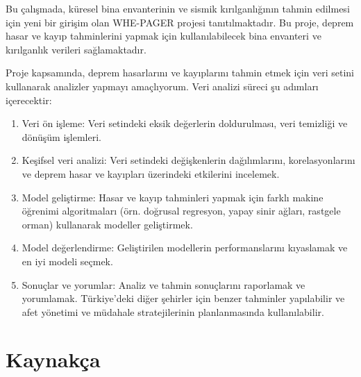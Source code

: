 \documentclass[
  12pt,
]{article}
\providecommand{\tightlist}{%
  \setlength{\itemsep}{0pt}\setlength{\parskip}{0pt}}
\newlength{\cslhangindent}
\newlength{\cslentryspacingunit} %
\newenvironment{CSLReferences}[2] %
 {%
  \setlength{\parindent}{0pt}
  \ifodd #1
  \let\oldpar\par
  \def\par{\hangindent=\cslhangindent\oldpar}
  \fi
  \setlength{\parskip}{#2\cslentryspacingunit}
 }%
 {}
\begin{document}
Bu çalışmada, küresel bina envanterinin ve sismik kırılganlığının tahmin edilmesi için yeni bir girişim olan WHE-PAGER projesi tanıtılmaktadır. Bu proje, deprem hasar ve kayıp tahminlerini yapmak için kullanılabilecek bina envanteri ve kırılganlık verileri sağlamaktadır.

Proje kapsamında, deprem hasarlarını ve kayıplarını tahmin etmek için veri setini kullanarak analizler yapmayı amaçlıyorum. Veri analizi süreci şu adımları içerecektir:

\begin{enumerate}
\def\labelenumi{\arabic{enumi}.}
\tightlist
\item
  Veri ön işleme: Veri setindeki eksik değerlerin doldurulması, veri temizliği ve dönüşüm işlemleri.
\item
  Keşifsel veri analizi: Veri setindeki değişkenlerin dağılımlarını, korelasyonlarını ve deprem hasar ve kayıpları üzerindeki etkilerini incelemek.
\item
  Model geliştirme: Hasar ve kayıp tahminleri yapmak için farklı makine öğrenimi algoritmaları (örn. doğrusal regresyon, yapay sinir ağları, rastgele orman) kullanarak modeller geliştirmek.
\item
  Model değerlendirme: Geliştirilen modellerin performanslarını kıyaslamak ve en iyi modeli seçmek.
\item
  Sonuçlar ve yorumlar: Analiz ve tahmin sonuçlarını raporlamak ve yorumlamak. Türkiye'deki diğer şehirler için benzer tahminler yapılabilir ve afet yönetimi ve müdahale stratejilerinin planlanmasında kullanılabilir.
\end{enumerate}

\newpage

\hypertarget{references}{%
\section{Kaynakça}\label{references}}

\hypertarget{refs}{}
\begin{CSLReferences}{0}{0}
\end{CSLReferences}
\end{document}
